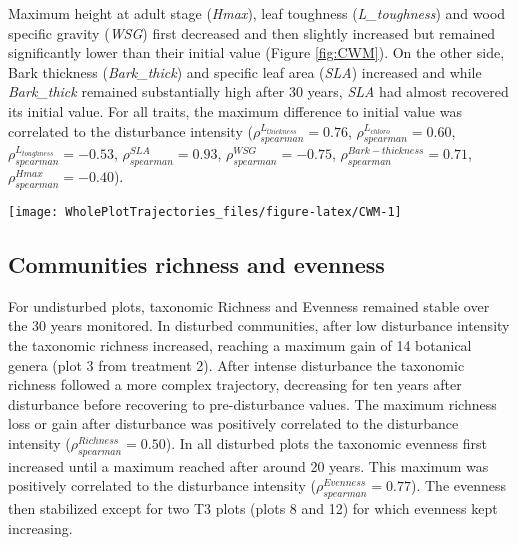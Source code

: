 \documentclass[fleqn,10pt]{ArtEcoFoG} %
\begin{document}
Maximum height at adult stage (\emph{Hmax}), leaf toughness
(\emph{L\_toughness}) and wood specific gravity (\emph{WSG}) first
decreased and then slightly increased but remained significantly lower
than their initial value (Figure \ref{fig:CWM}). On the other side, Bark
thickness (\emph{Bark\_thick}) and specific leaf area (\emph{SLA})
increased and while \emph{Bark\_thick} remained substantially high after
30 years, \emph{SLA} had almost recovered its initial value. For all
traits, the maximum difference to initial value was correlated to the
disturbance intensity (\(\rho_{spearman}^{L_{thickness}}=0.76\),
\(\rho_{spearman}^{L_{chloro}}=0.60\),
\(\rho_{spearman}^{L_{toughness}}=-0.53\),
\(\rho_{spearman}^{SLA}=0.93\), \(\rho_{spearman}^{WSG}=-0.75\),
\(\rho_{spearman}^{Bark-thickness}=0.71\),
\(\rho_{spearman}^{Hmax}=-0.40\)).

\begin{figure*}

{\centering \texttt{[image: WholePlotTrajectories\_files/figure-latex/CWM-1]} 

}

\caption{Trajectories of the communities weighted means (CWM) over 30 years after disturbance of 4 leaf traits (Leaf thickness, \emph{L\_thickness}, chlorophyll content, \emph{L\_chloro}, toughness, \emph{L\_toughness} and specific area, \emph{SLA}), 2 stem traits (wood specific gravity, \emph{WSG}, and bark thickness, \emph{Bark-thick}) and one life history trait (Specific maximum height at adult stage, \emph{Hmax}). Colors are treatments: green (control), blue (T1), orange (T2), red (T3) with shaded areas the credibility intervals.}\label{fig:CWM}
\end{figure*}

\subsection{Communities richness and
evenness}\label{communities-richness-and-evenness}

For undisturbed plots, taxonomic Richness and Evenness remained stable
over the 30 years monitored. In disturbed communities, after low
disturbance intensity the taxonomic richness increased, reaching a
maximum gain of 14 botanical genera (plot 3 from treatment 2). After
intense disturbance the taxonomic richness followed a more complex
trajectory, decreasing for ten years after disturbance before recovering
to pre-disturbance values. The maximum richness loss or gain after
disturbance was positively correlated to the disturbance intensity
(\(\rho_{spearman}^{Richness}=0.50\)). In all disturbed plots the
taxonomic evenness first increased until a maximum reached after around
20 years. This maximum was positively correlated to the disturbance
intensity (\(\rho_{spearman}^{Evenness}=0.77\)). The evenness then
stabilized except for two T3 plots (plots 8 and 12) for which evenness
kept increasing.
\end{document}
